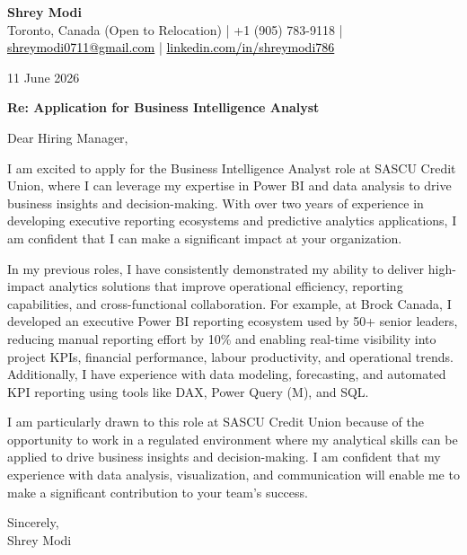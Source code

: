 \documentclass[11pt,letterpaper]{article}
\begin{document}
\begin{center}
  {\Large \bfseries \color{accent} Shrey Modi}\\[0.2em]
  {\small Toronto, Canada (Open to Relocation) | +1 (905) 783-9118 | \href{mailto:shreymodi0711@gmail.com}{\textcolor{black}{shreymodi0711@gmail.com}} | \href{https://linkedin.com/in/shreymodi786}{\textcolor{black}{linkedin.com/in/shreymodi786}}}
\end{center}

\vspace{1em}

11 June 2026

\vspace{0.5em}


\textbf{Re: Application for Business Intelligence Analyst}

Dear Hiring Manager,

I am excited to apply for the Business Intelligence Analyst role at SASCU Credit Union, where I can leverage my expertise in Power BI and data analysis to drive business insights and decision-making. With over two years of experience in developing executive reporting ecosystems and predictive analytics applications, I am confident that I can make a significant impact at your organization.

In my previous roles, I have consistently demonstrated my ability to deliver high-impact analytics solutions that improve operational efficiency, reporting capabilities, and cross-functional collaboration. For example, at Brock Canada, I developed an executive Power BI reporting ecosystem used by 50+ senior leaders, reducing manual reporting effort by 10\% and enabling real-time visibility into project KPIs, financial performance, labour productivity, and operational trends. Additionally, I have experience with data modeling, forecasting, and automated KPI reporting using tools like DAX, Power Query (M), and SQL.

I am particularly drawn to this role at SASCU Credit Union because of the opportunity to work in a regulated environment where my analytical skills can be applied to drive business insights and decision-making. I am confident that my experience with data analysis, visualization, and communication will enable me to make a significant contribution to your team's success.

Sincerely,\\
Shrey Modi
\end{document}
